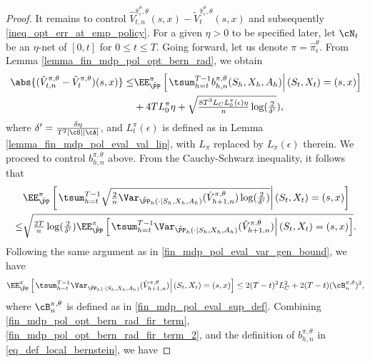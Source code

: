 \documentclass[9pt]{article}
\numberwithin{equation}{section}
\begin{document}
\begin{proof}
It remains to control 
$\hat{V}_{t,n}^{\hat{\pi}_\epsilon^\theta, \theta}(s,x) - \tilde{V}_t^{\hat{\pi}_\epsilon^\theta,\theta}(s,x)$
and subsequently \eqref{ineq_opt_err_at_emp_policy}. For a given $\eta > 0$ to be specified later, let $\cN_t$ be an $\eta$-net of $[0,t]$ for $0 \leq t \leq T$. Going forward, let us denote $\pi = \hat{\pi}_\epsilon^\theta$. From Lemma \ref{lemma_fin_mdp_pol_opt_bern_rad}, we obtain
%
\begin{align}
    \abs{ (\hat{V}_{t,n}^{\pi, \theta} - \tilde{V}_t^{\pi, \theta})(s,x)} \leq & \EE_{\tilde \PP}^\pi \left[\left. \tsum_{h=t}^{T-1}b_{h,n}^{\pi, \theta}(S_h, X_h, A_h)\right| (S_t, X_t) = (s,x) \right] \nonumber  \\
    & + 4TL_{0}^\pi \eta + \sqrt{\tfrac{8T^3L_C L_{0}^\pi(\epsilon) \eta}{n} \log(\tfrac{2}{\delta'}}),
    \label{fin_mdp_pol_opt_gen_bound}
    \end{align}
%
where $\delta' = \tfrac{\delta \eta}{T^2 |\cS| |\cA|}$,
and $L^\pi_t(\epsilon)$ is defined as in Lemma \ref{lemma_fin_mdp_pol_eval_val_lip}, with $L_\pi$ replaced by $L_\pi({\epsilon})$ therein.
We proceed to control $b^{\pi, \theta}_{h,n}$ above. 
From the Cauchy-Schwarz inequality, it follows that
%
\begin{align}
     & \EE_{\tilde \PP}^\pi\left[ \left. \tsum_{h=t}^{T-1} \sqrt{\tfrac{2}{n} \Var_{\tilde{\PP}_{h}(\cdot|S_h, X_h, A_h)}(\hat{V}_{h+1,n}^{\pi, \theta}) \log(\tfrac{2}{\delta'})} \right| (S_t, X_t) = (s,x)\right] \nonumber \\
    \leq & \sqrt{\tfrac{2T}{n} \log(\tfrac{2}{\delta'}) \EE_{\tilde \PP}^\pi \left[ \left. \tsum_{h=t}^{T-1} \Var_{\tilde{\PP}_{h}(\cdot|S_h, X_h, A_h)}(\hat{V}_{h+1,n}^{\pi, \theta}) \right| (S_t, X_t) = (s,x)\right] }. \label{fin_mdp_pol_opt_bern_rad_fir_term}
\end{align}
%
Following the same argument as in  \eqref{fin_mdp_pol_eval_var_gen_bound}, we have
%
\begin{align}
    \EE_{\tilde \PP}^\pi \left[ \left. \tsum_{h=t}^{T-1} \Var_{\tilde{\PP}_{h}(\cdot|S_h, X_h, A_h)}(\hat{V}_{h+1,n}^{\pi, \theta}) \right| (S_t, X_t) = (s,x)\right] \leq 2(T-t)^2 L_C^2 + 2(T-t) (\cB^{\pi,\theta}_n)^2, \label{fin_mdp_pol_opt_bern_rad_fir_term_2}
\end{align}
where  $\cB^{\pi,\theta}_n$ is defined as in \eqref{fin_mdp_pol_eval_sup_def}. 
Combining \eqref{fin_mdp_pol_opt_bern_rad_fir_term}, \eqref{fin_mdp_pol_opt_bern_rad_fir_term_2}, and the definition of $b^{\pi,\theta}_{h,n}$ in \eqref{eq_def_local_bernstein}, we have 

\end{proof}
\end{document}
